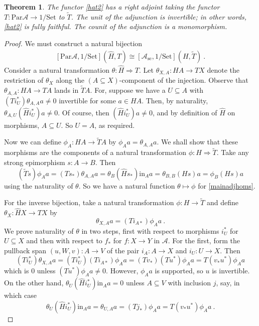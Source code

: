 \documentclass[a4paper,12pt,reqno]{amsart}
\newtheorem{theorem}{Theorem}[section] %
\theoremstyle{definition}
\theoremstyle{fact}
\theoremstyle{genquest}
\theoremstyle{step}
\newcommand{\lra}{\longrightarrow}
\newcommand{\Lra}{\Longrightarrow}
\def\CA{{\mathscr A}}
\begin{document}
\begin{theorem}\label{mainadj}
The functor \eqref{hat2} has a right adjoint taking the functor $T : \mathrm{Par}\CA \lra 1/\mathrm{Set}$ to $\widetilde{T}$.
The unit of the adjunction is invertible; in other words, \eqref{hat2} is fully faithful.
The counit of the adjunction is a monomorphism. 
\end{theorem}
\begin{proof}
We must construct a natural bijection
\begin{eqnarray}\label{mainadjhoms}
[\mathrm{Par}\CA, 1/\mathrm{Set}](\widehat{H},T) \cong [\CA_{\mathrm{se}}, 1/\mathrm{Set}](H,\widetilde{T}) \ .
\end{eqnarray}
Consider a natural transformation $\theta : \widehat{H} \Lra T$. 
Let $\theta_{X,A} : HA \lra TX$ denote the restriction of $\theta_X$ along
the $(A\subseteq X)$-component of the injection. 
Observe that $\theta_{A,A} : HA \lra TA$ lands in $\widetilde{T}A$. 
For, suppose we have a $U\subseteq A$ with 
$(Ti_U^*)\theta_{A,A}a\neq 0$
invertible for some $a\in HA$. Then, by naturality,
$\theta_{A,U}(\widehat{H}i_U^*)a\neq 0$.
Of course, then $(\widehat{H}i_U^*)a\neq 0$, and by definition of
$\widehat{H}$ on morphisms, $A\subseteq U$. So $U=A$, as required.

Now we can define $\phi_A : HA \lra \widetilde{T}A$ by $\phi_Aa=\theta_{A,A}a$.
We shall show that these morphisms are the components of a 
natural transformation $\phi : H \Lra \widetilde{T}$. Take any strong epimorphism
$s:A\lra B$. Then
$$(\widetilde{T}s)\phi_Aa = (Ts_*)\theta_{A,A}a = \theta_B(\widehat{H}s_*)\mathrm{in}_Aa=\theta_{B,B}(Hs)a = \phi_B(Hs)a$$
using the naturality of $\theta$. 
So we have a natural function $\theta \mapsto \phi$ for \eqref{mainadjhoms}.  

For the inverse bijection, take a natural transformation $\phi : H \lra \widetilde{T}$
and define $\theta_X : \widehat{H}X \lra TX$ by
$$\theta_{X,A}a = (Ti_{A *})\phi_Aa \ .$$ 
We prove naturality of $\theta$ in two steps, first with respect to morphisms 
$i_U^*$ for $U\subseteq X$ and then with respect to $f_*$ for $f : X\lra Y$
in $\CA$.
For the first, form the pullback span $(u,W,v) : A \lra V$ of the pair 
$i_A : A \lra X$ and $i_U :U \lra X$. Then
$$(Ti_U^*)\theta_{X,A}a = (Ti_U^*)(Ti_{A *})\phi_Aa = (Tv_*)(Tu^*)\phi_Aa = T(v_*u^*)\phi_Aa$$
which is $0$ unless $(Tu^*)\phi_Aa \neq 0$. However, $\phi_Aa$ is supported,
so $u$ is invertible. On the other hand, 
$\theta_U(\widehat{H}i_U^*)\mathrm{in}_Aa = 0$
unless $A\subseteq V$ with inclusion $j$, say, in which case 
$$\theta_U(\widehat{H}i_U^*)\mathrm{in}_Aa = \theta_{U,A}a = (Tj_*)\phi_Aa = T(v_*u^*)\phi_Aa \ .$$ 


\end{proof}
\end{document}
